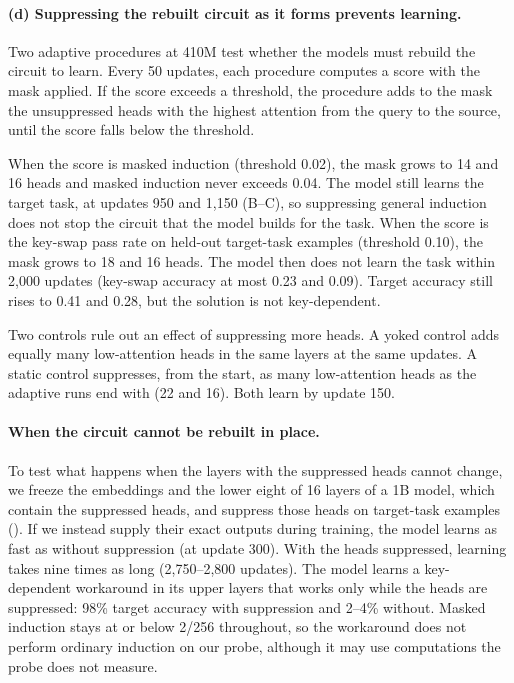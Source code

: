 \paragraph{(d) Suppressing the rebuilt circuit as it forms prevents learning.}
Two adaptive procedures at 410M test whether the models must rebuild the circuit to
learn. Every 50 updates, each procedure computes a score with the mask applied. If
the score exceeds a threshold, the procedure adds to the mask the unsuppressed heads
with the highest attention from the query to the source, until the score falls below
the threshold.

When the score is masked induction (threshold 0.02), the mask grows to 14 and 16
heads and masked induction never exceeds 0.04. The model still learns the target
task, at updates 950 and 1,150 (B--C), so suppressing general
induction does not stop the circuit that the model builds for the task. When the
score is the key-swap pass rate on held-out target-task examples (threshold 0.10),
the mask grows to 18 and 16 heads. The model then does not learn the task within
2,000 updates (key-swap accuracy at most 0.23 and 0.09). Target accuracy still rises
to 0.41 and 0.28, but the solution is not key-dependent.

Two controls rule out an effect of suppressing more heads. A yoked control adds
equally many low-attention heads in the same layers at the same updates. A static
control suppresses, from the start, as many low-attention heads as the adaptive runs
end with (22 and 16). Both learn by update 150.

\paragraph{When the circuit cannot be rebuilt in place.}
To test what happens when the layers with the suppressed heads cannot change, we
freeze the embeddings and the lower eight of 16 layers of a 1B model, which contain
the suppressed heads, and suppress those heads on target-task examples
(). If we instead supply their exact outputs during training, the
model learns as fast as without suppression (at update 300). With the heads
suppressed, learning takes nine times as long (2,750--2,800 updates). The model
learns a key-dependent workaround in its upper layers that works only while the
heads are suppressed: 98\% target accuracy with suppression and 2--4\% without.
Masked induction stays at or below 2/256 throughout, so the workaround does not
perform ordinary induction on our probe, although it may use computations the probe
does not measure.

